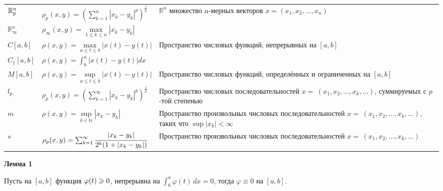 {\begin{tabularx}{\textwidth}{||l|l|X||}
    $\mathbb{R}^n_p$                 & $\rho_p (x, y)=(\sum_{k = 1}^{n}|x_k-y_k|^p)^\frac{1}{p}$                  & \multirow{2}{6cm}{$\mathbb{R}^n$ множество n-мерных векторов $x=(x_1, x_2, \dots, x_n)$  }                               \\
    \cline{1-2}
    $\mathbb{R}^n_\infty $ & $\rho_\infty  (x, y)=\underset{1\leq k\leq n}{\max}|x_k-y_k|$              &                                                                                                                          \\
    \hline
    $C[a, b]$              & $\rho (x, y)=\underset{a \leq t \leq b}{\max}|x(t)-y(t)|$                  & \multirow{2}{6cm}{Пространство числовых функций, непрерывных на $[a, b]$}                                                \\
    \cline{1-2}
    $C_1[a, b]$            & $\rho (x, y)=\int_{b}^{a}|x(t)-y(t)|dx $                                   &                                                                                                                          \\[5pt]
    \hline
    $M[a, b]$              & $\rho (x, y)=\underset{a \leq t \leq b}{\sup}|x(t)-y(t)|$                  & Пространство числовых функций, определённых и ограниченных на $[a, b]$                                                   \\
    \hline
    $l_p$                  & $\rho_p (x, y)=(\sum_{k = 1}^{\infty }|x_k-y_k|^p)^\frac{1}{p}$            & Пространство числовых последовательностей $x=~(x_1, x_2, \dots, x_k, \dots)$, суммируемых с $p$-той степенью             \\
    \hline
    $m$                    & $\rho (x, y)=\underset{k \in \mathbb{N} }{\sup}|x_k-y_k|$                  & Пространство произвольных числовых последовательностей $x=~(x_1, x_2, \dots, x_k, \dots)$, таких что $\sup|x_k|<\infty $ \\
    \hline
    $s$                    & $\rho_p (x, y)=\sum_{k = 1}^{\infty } \cfrac{|x_k-y_k|}{2^k(1+|x_k-y_k|)}$ & Пространство произвольных числовых последовательностей $x=~(x_1, x_2, \dots, x_k, \dots)$                                \\
    \hline
\end{tabularx}}
\vspace{\baselineskip}

\textbf{Лемма 1}

Пусть на $[a, b]$ функция $\varphi (t) \geqslant 0$, непрерывна на $\int_{b}^{a}\varphi
    (t)\, dx=0$, тогда $\varphi\equiv 0$ на $[a, b]$.

